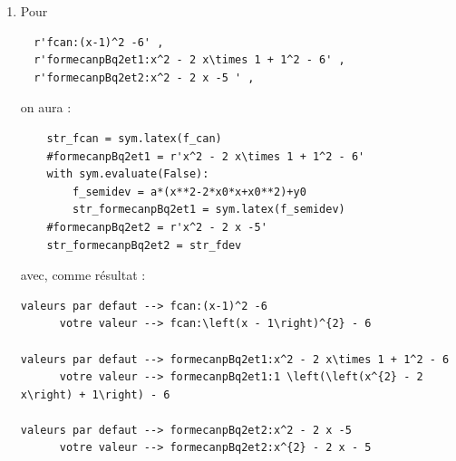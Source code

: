 {\begin{enumerate}
\begin{verbatim}
valeurs par defaut --> fm1pBq1:(-1)^2 - 2 \times (-1) -5 = -2
      votre valeur --> fm1pBq1:-5 + \left(-1\right)^{2} - \left(-1\right) 2 = -2

valeurs par defaut --> fm2pBq1: (\sqrt{2})^2 - 2 \times \sqrt{2} -5 = 2 - 2 \times \sqrt{2} -5 =  -3 - 2  \sqrt{2}  
      votre valeur --> fm2pBq1:-5 - 2 \sqrt{2} + \left(\sqrt{2}\right)^{2} = -3 - 2 \sqrt{2}
\end{verbatim}

\item Pour
\begin{verbatim}
  r'fcan:(x-1)^2 -6' , 
  r'formecanpBq2et1:x^2 - 2 x\times 1 + 1^2 - 6' , 
  r'formecanpBq2et2:x^2 - 2 x -5 ' , 
\end{verbatim}
on aura : 
\begin{verbatim}
    str_fcan = sym.latex(f_can)
    #formecanpBq2et1 = r'x^2 - 2 x\times 1 + 1^2 - 6'     
    with sym.evaluate(False):
        f_semidev = a*(x**2-2*x0*x+x0**2)+y0
        str_formecanpBq2et1 = sym.latex(f_semidev)
    #formecanpBq2et2 = r'x^2 - 2 x -5'  
    str_formecanpBq2et2 = str_fdev
\end{verbatim}
avec, comme résultat :
\begin{verbatim}
valeurs par defaut --> fcan:(x-1)^2 -6
      votre valeur --> fcan:\left(x - 1\right)^{2} - 6

valeurs par defaut --> formecanpBq2et1:x^2 - 2 x\times 1 + 1^2 - 6
      votre valeur --> formecanpBq2et1:1 \left(\left(x^{2} - 2 x\right) + 1\right) - 6

valeurs par defaut --> formecanpBq2et2:x^2 - 2 x -5 
      votre valeur --> formecanpBq2et2:x^{2} - 2 x - 5
\end{verbatim}


\end{enumerate}}
